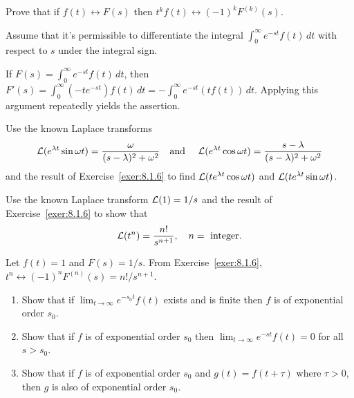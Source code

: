\documentclass{ximera}
\begin{document}
\begin{problem}\label{exer:8.1.6}
Prove that if $f(t)\leftrightarrow F(s)$ then $t^kf(t)\leftrightarrow
(-1)^kF^{(k)}(s)$.

\begin{hint}
    Assume that it's permissible to differentiate
the integral $\int_0^\infty e^{-st}f(t)\,dt$ with respect to $s$ under
the integral sign.
\end{hint}

\begin{solution}
If $F(s)=\int_0^\infty e^{-st}f(t)\,dt$, then
$F'(s)=\int_0^\infty(-te^{-st})f(t)\,dt=-\int_0^\infty
e^{-st}(tf(t))\,dt$. Applying this argument repeatedly yields
the assertion.
\end{solution}
\end{problem}

\begin{problem}\label{exer:8.1.7}
Use the known Laplace transforms
$$
{\cal L}(e^{\lambda t}\sin\omega t)=\frac{\omega}{(s-\lambda)^2+\omega^2}
\quad\text{and }\quad
{\cal L}(e^{\lambda t}\cos\omega t)=\frac{s-\lambda}{(s-\lambda)^2+\omega^2}
$$
  and the result of Exercise~\ref{exer:8.1.6} to find
${\cal L}(te^{\lambda t}\cos\omega t)$ and
${\cal L}(te^{\lambda t}\sin\omega t)$.
\end{problem}

\begin{problem}\label{exer:8.1.8}
 Use the known Laplace transform ${\cal L}(1)=1/s$ and the result of
Exercise~\ref{exer:8.1.6} to show that
$$
{\cal L}(t^n)=\frac{n!}{s^{n+1}},\quad n=\text{ integer}.
$$

\begin{solution}
Let $f(t)=1$ and $F(s)=1/s$. From
Exercise~\ref{exer:8.1.6},
$t^n\leftrightarrow(-1)^nF^{(n)}(s)=n!/s^{n+1}$.
\end{solution}
\end{problem}

\begin{problem}\label{exer:8.1.9}
\begin{enumerate}
\item %
 Show that if $\lim_{t\to\infty} e^{-s_0t} f(t)$ exists and
is finite then  $f$ is of exponential order $s_0$.
\item %
 Show that if $f$ is of exponential order $s_0$ then $\lim_{t
\to\infty} e^{-st} f(t)=0$ for all $s>s_0$.
\item %
Show that if $f$ is of exponential order $s_0$  and $g(t)=f(t+\tau)$
where $\tau>0$, then $g$ is also of exponential order $s_0$.
\end{enumerate}
\end{problem}
\end{document}
